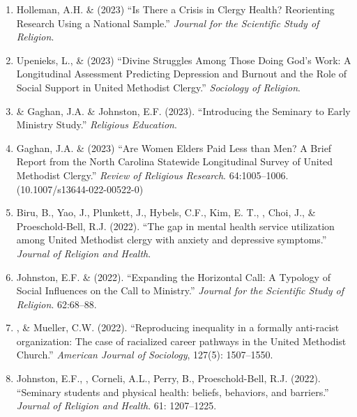 \begin{enumerate}
\item Holleman, A.H. \& \Eagle\hspace{.01em} (2023) ``Is There a Crisis in Clergy Health? Reorienting Research Using a National Sample.'' \textit{Journal for the Scientific Study of Religion}. 

\item Upenieks, L., \& \Eagle\hspace{0.1em} (2023) ``Divine Struggles Among Those Doing God’s Work: A Longitudinal Assessment Predicting Depression and Burnout and the Role of Social Support in United Methodist Clergy.'' \textit{Sociology of Religion}.  

\item \Eagle \hspace{.01em} \& Gaghan, J.A. \& Johnston, E.F. (2023). ``Introducing the Seminary to Early Ministry Study.''  \textit{Religious Education}. 

\item Gaghan, J.A. \& \Eagle \hspace{0.1em} (2023) ``Are Women Elders Paid Less than Men? A Brief Report from the North Carolina Statewide Longitudinal Survey of United Methodist Clergy.'' \textit{Review of Religious Research}. 64:1005--1006. \doi(10.1007/s13644-022-00522-0)
	
\item Biru, B., Yao, J., Plunkett, J., Hybels, C.F., Kim, E. T., \Eagle, Choi, J., \& Proeschold-Bell, R.J. (2022). ``The gap in mental health service utilization among United Methodist clergy with anxiety and depressive symptoms.'' \textit{Journal of Religion and Health}. 
	
\item Johnston, E.F. \& \Eagle  \hspace{.1em} (2022). ``Expanding the Horizontal Call: A Typology of Social Influences on the Call to Ministry.'' \textit{Journal for the Scientific Study of Religion}. 62:68--88.  

\item \Eagle, \& Mueller, C.W. \hspace{.1em} (2022). ``Reproducing inequality in a formally anti-racist organization: The case of racialized career pathways in the United Methodist Church.'' \textit{American Journal of Sociology}, 127(5): 1507–1550. 

\item Johnston, E.F., \Eagle, Corneli, A.L., Perry, B., Proeschold-Bell, R.J.  (2022). ``Seminary students and physical health: beliefs, behaviors, and barriers.'' \textit{Journal of Religion and Health}. 61: 1207--1225. 


\end{enumerate}
